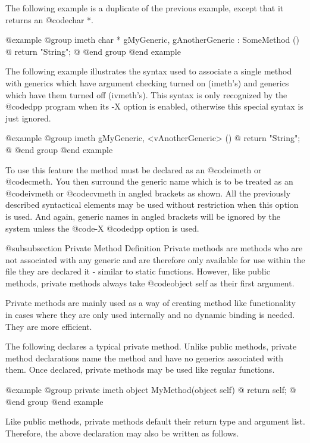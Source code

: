 The following example is a duplicate of the previous example, except
that it returns an @code{char *}.

@example
@group
imeth   char * gMyGeneric, gAnotherGeneric : SomeMethod ()
@{
        return "String";
@}
@end group
@end example


The following example illustrates the syntax used to associate a single
method with generics which have argument checking turned on (imeth's)
and generics which have them turned off (ivmeth's).  This syntax is
only recognized by the @code{dpp} program when its {-X} option is enabled,
otherwise this special syntax is just ignored.


@example
@group
imeth   gMyGeneric, <vAnotherGeneric> ()
@{
        return "String";
@}
@end group
@end example


To use this feature the method must be declared as an @code{imeth} or
@code{cmeth}.  You then surround the generic name which is to be
treated as an @code{ivmeth} or @code{cvmeth} in angled brackets as
shown.  All the previously described syntactical elements may be
used without restriction when this option is used.  And again,
generic names in angled brackets will be ignored by the system unless
the @code{-X} @code{dpp} option is used.












@subsubsection Private Method Definition
Private methods are methods who are not associated with any generic
and are therefore only available for use within the file they are
declared it - similar to static functions.  However, like public
methods, private methods always take @code{object self} as their
first argument.

Private methods are mainly used as a way of creating method like
functionality in cases where they are only used internally and no
dynamic binding is needed.  They are more efficient.

The following declares a typical private method.  Unlike public
methods, private method declarations name the method and have
no generics associated with them.  Once declared, private methods may
be used like regular functions.


@example
@group
private imeth   object  MyMethod(object self)
@{
        return self;
@}
@end group
@end example


Like public methods, private methods default their return type and
argument list.  Therefore, the above declaration may also be written as
follows.

